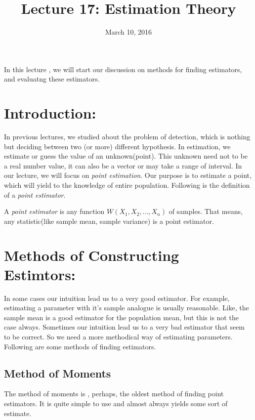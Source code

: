 \documentclass[a4paper,english,12pt]{article}
\title{Lecture 17: Estimation Theory}
\date{March 10, 2016}
\author{}
\begin{document}
\maketitle
\maketitle
In this lecture , we will start our discussion on methods for finding estimators, and evaluatng these estimators.
\section{Introduction:}
In previous lectures, we studied about the problem of detection, which is nothing but deciding between two (or more) different hypothesis. In estimation, we estimate or guess the value of an unknown(point). This unknown need not to be a real number value, it can also be a vector or may take a range of interval. In our lecture, we will focus on \textit{point estimation}. Our purpose is to estimate a point, which will yield to the knowledge of entire population. Following is the definition of a \textit{point estimator}.\\

\begin{defn}{ A \textit{point estimator} is any function $W(X_1,X_2,...,X_n)$ of samples. That means, any statistic(like sample mean, sample variance) is a point estimator.}
\end{defn}

\section{Methods of Constructing Estimtors: }
In some cases our intuition lead us to a very good estimator. For example, estimating a parameter with it's sample analogue is usually reasonable. Like, the sample mean is a good estimator for the population mean, but this is not the case always. Sometimes our intuition lead us to a very bad estimator that seem to be correct. So we need a more methodical way of estimating parameters. Following are some methods of finding estimators.

\subsection{Method of Moments}
The method of moments is , perhaps, the oldest method of finding point estimators. It is quite simple to use and almost always yields some sort of estimate.
\end{document}
